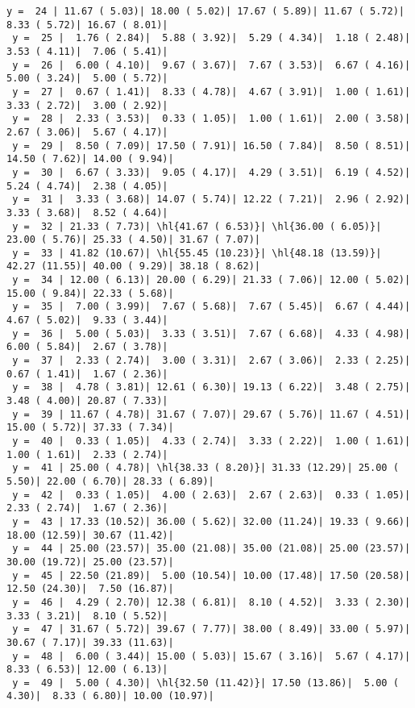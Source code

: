 \documentclass[10pt]{article}
\newcommand{\hl}[1]{\textcolor{blue}{#1}}
\begin{document}
\begin{Verbatim}[fontsize=\small, commandchars=\\\{\}]
 y =  24 | 11.67 ( 5.03)| 18.00 ( 5.02)| 17.67 ( 5.89)| 11.67 ( 5.72)|  8.33 ( 5.72)| 16.67 ( 8.01)|
 y =  25 |  1.76 ( 2.84)|  5.88 ( 3.92)|  5.29 ( 4.34)|  1.18 ( 2.48)|  3.53 ( 4.11)|  7.06 ( 5.41)|
 y =  26 |  6.00 ( 4.10)|  9.67 ( 3.67)|  7.67 ( 3.53)|  6.67 ( 4.16)|  5.00 ( 3.24)|  5.00 ( 5.72)|
 y =  27 |  0.67 ( 1.41)|  8.33 ( 4.78)|  4.67 ( 3.91)|  1.00 ( 1.61)|  3.33 ( 2.72)|  3.00 ( 2.92)|
 y =  28 |  2.33 ( 3.53)|  0.33 ( 1.05)|  1.00 ( 1.61)|  2.00 ( 3.58)|  2.67 ( 3.06)|  5.67 ( 4.17)|
 y =  29 |  8.50 ( 7.09)| 17.50 ( 7.91)| 16.50 ( 7.84)|  8.50 ( 8.51)| 14.50 ( 7.62)| 14.00 ( 9.94)|
 y =  30 |  6.67 ( 3.33)|  9.05 ( 4.17)|  4.29 ( 3.51)|  6.19 ( 4.52)|  5.24 ( 4.74)|  2.38 ( 4.05)|
 y =  31 |  3.33 ( 3.68)| 14.07 ( 5.74)| 12.22 ( 7.21)|  2.96 ( 2.92)|  3.33 ( 3.68)|  8.52 ( 4.64)|
 y =  32 | 21.33 ( 7.73)| \hl{41.67 ( 6.53)}| \hl{36.00 ( 6.05)}| 23.00 ( 5.76)| 25.33 ( 4.50)| 31.67 ( 7.07)|
 y =  33 | 41.82 (10.67)| \hl{55.45 (10.23)}| \hl{48.18 (13.59)}| 42.27 (11.55)| 40.00 ( 9.29)| 38.18 ( 8.62)|
 y =  34 | 12.00 ( 6.13)| 20.00 ( 6.29)| 21.33 ( 7.06)| 12.00 ( 5.02)| 15.00 ( 9.84)| 22.33 ( 5.68)|
 y =  35 |  7.00 ( 3.99)|  7.67 ( 5.68)|  7.67 ( 5.45)|  6.67 ( 4.44)|  4.67 ( 5.02)|  9.33 ( 3.44)|
 y =  36 |  5.00 ( 5.03)|  3.33 ( 3.51)|  7.67 ( 6.68)|  4.33 ( 4.98)|  6.00 ( 5.84)|  2.67 ( 3.78)|
 y =  37 |  2.33 ( 2.74)|  3.00 ( 3.31)|  2.67 ( 3.06)|  2.33 ( 2.25)|  0.67 ( 1.41)|  1.67 ( 2.36)|
 y =  38 |  4.78 ( 3.81)| 12.61 ( 6.30)| 19.13 ( 6.22)|  3.48 ( 2.75)|  3.48 ( 4.00)| 20.87 ( 7.33)|
 y =  39 | 11.67 ( 4.78)| 31.67 ( 7.07)| 29.67 ( 5.76)| 11.67 ( 4.51)| 15.00 ( 5.72)| 37.33 ( 7.34)|
 y =  40 |  0.33 ( 1.05)|  4.33 ( 2.74)|  3.33 ( 2.22)|  1.00 ( 1.61)|  1.00 ( 1.61)|  2.33 ( 2.74)|
 y =  41 | 25.00 ( 4.78)| \hl{38.33 ( 8.20)}| 31.33 (12.29)| 25.00 ( 5.50)| 22.00 ( 6.70)| 28.33 ( 6.89)|
 y =  42 |  0.33 ( 1.05)|  4.00 ( 2.63)|  2.67 ( 2.63)|  0.33 ( 1.05)|  2.33 ( 2.74)|  1.67 ( 2.36)|
 y =  43 | 17.33 (10.52)| 36.00 ( 5.62)| 32.00 (11.24)| 19.33 ( 9.66)| 18.00 (12.59)| 30.67 (11.42)|
 y =  44 | 25.00 (23.57)| 35.00 (21.08)| 35.00 (21.08)| 25.00 (23.57)| 30.00 (19.72)| 25.00 (23.57)|
 y =  45 | 22.50 (21.89)|  5.00 (10.54)| 10.00 (17.48)| 17.50 (20.58)| 12.50 (24.30)|  7.50 (16.87)|
 y =  46 |  4.29 ( 2.70)| 12.38 ( 6.81)|  8.10 ( 4.52)|  3.33 ( 2.30)|  3.33 ( 3.21)|  8.10 ( 5.52)|
 y =  47 | 31.67 ( 5.72)| 39.67 ( 7.77)| 38.00 ( 8.49)| 33.00 ( 5.97)| 30.67 ( 7.17)| 39.33 (11.63)|
 y =  48 |  6.00 ( 3.44)| 15.00 ( 5.03)| 15.67 ( 3.16)|  5.67 ( 4.17)|  8.33 ( 6.53)| 12.00 ( 6.13)|
 y =  49 |  5.00 ( 4.30)| \hl{32.50 (11.42)}| 17.50 (13.86)|  5.00 ( 4.30)|  8.33 ( 6.80)| 10.00 (10.97)|

\end{Verbatim}
\end{document}

